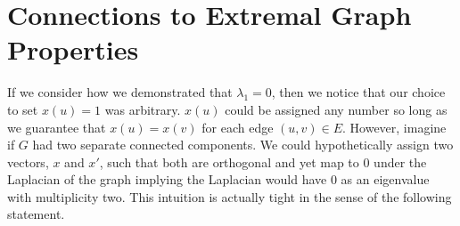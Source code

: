 
\section{Connections to Extremal Graph Properties}

If we consider how we demonstrated that $\lambda_1 = 0$, then we notice that our choice to set $x(u) = 1$ was arbitrary. $x(u)$ could be assigned any number so long as we guarantee that $x(u) = x(v)$ for each edge $(u, v) \in E$. However, imagine if $G$ had two separate connected components. We could hypothetically assign two vectors, $x$ and $x'$, such that both are orthogonal and yet map to 0 under the Laplacian of the graph implying the Laplacian would have 0 as an eigenvalue with multiplicity two. This intuition is actually tight in the sense of the following statement.

